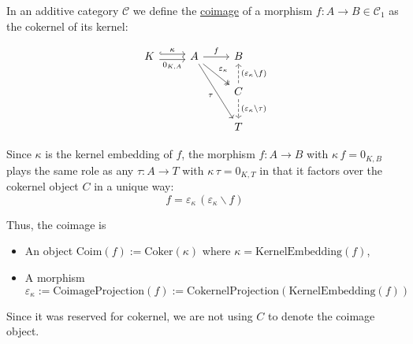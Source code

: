 \begin{definition}[Coimage]
In an additive category $\mathcal{C}$ we define the \ul{coimage} of a morphism $f : A \rightarrow B \in \mathcal{C}_{1}$ as the 
cokernel of its kernel:\\
\begin{minipage}{.06\textwidth} \phantom{} \end{minipage}
\begin{minipage}{.39\textwidth}
\[
\begin{tikzcd}[
  ampersand replacement=\&,
]
K \arrow[r, "\kappa", hook, shift left] \arrow[r, "{0_{K,A}}"', shift right] \& A \arrow[r, "f"] \arrow[rd, "{\varepsilon_{\kappa}}", two heads] \arrow[rdd, "\tau"'] \& B                                                                                                   \\
                                                                             \&                                                                            \& C \arrow[u, "({\varepsilon_{\kappa}}\backslash f)"', dashed] \arrow[d, "({\varepsilon_{\kappa}}\backslash \tau)", dashed] \\
                                                                             \&                                                                            \& T                                                                                                  
\end{tikzcd}
\]
\end{minipage}
\begin{minipage}{.49\textwidth}
Since $\kappa$ is the kernel embedding of $f$, the morphism $f : A \rightarrow B$ with $\kappa\,f = 0_{K,B}$ plays the
same role as any $\tau : A \rightarrow T$ with $\kappa\,\tau = 0_{K,T}$ in that it factors over the cokernel object $C$ in a
unique way:
\[
f = \varepsilon_{\kappa}\,(\varepsilon_{\kappa}\backslash f)
\]
\end{minipage}
\begin{minipage}{.06\textwidth} \phantom{} \end{minipage}

Thus, the coimage is
\begin{itemize}
\item An object $\mathrm{Coim}(f) := \mathrm{Coker}(\kappa)$ where $\kappa = \mathrm{KernelEmbedding}(f)$,
\item A morphism $\varepsilon_{\kappa} := \mathrm{CoimageProjection}(f) := \mathrm{CokernelProjection}(\mathrm{KernelEmbedding}(f))$
\end{itemize}
Since it was reserved for cokernel, we are not using $C$ to denote the coimage object.
\end{definition}

